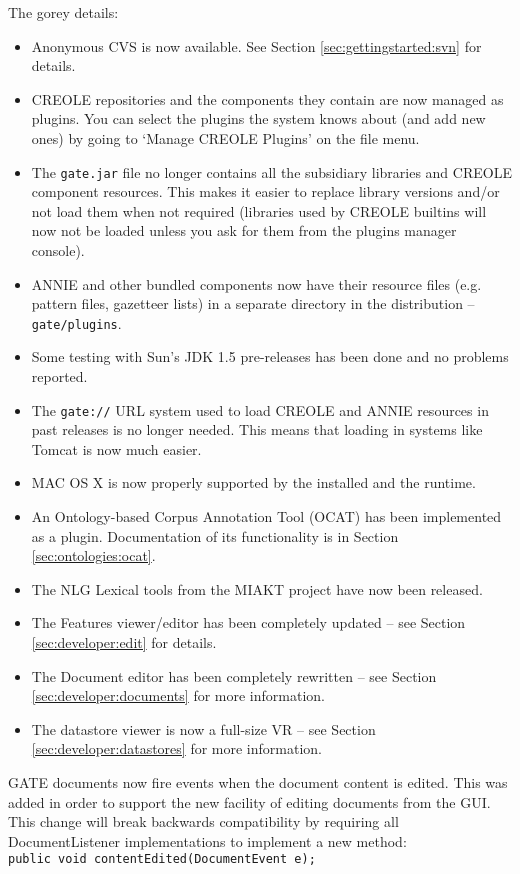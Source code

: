 The gorey details:
\begin{itemize}
%
\item
Anonymous CVS is now available.  See Section \ref{sec:gettingstarted:svn} for details.
%
\item
CREOLE repositories and the components they contain are now managed as
plugins. You can select the plugins the system knows about (and add new
ones) by going to `Manage CREOLE Plugins' on the file menu.
%
\item
The {\tt gate.jar} file no longer contains all the subsidiary libraries and
CREOLE component resources. This makes it easier to replace library versions
and/or not load them when not required (libraries used by CREOLE builtins
will now not be loaded unless you ask for them from the plugins manager
console).
%
\item
ANNIE and other bundled components now have their resource files (e.g.
pattern files, gazetteer lists) in a separate directory in the distribution
-- {\tt gate/plugins}.
%
\item
Some testing with Sun's JDK 1.5 pre-releases has been done and no problems
reported.
%
\item
The {\tt gate://} URL system used to load CREOLE and ANNIE resources in past
releases is no longer needed. This means that loading in systems like Tomcat
is now much easier.
%
\item
MAC OS X is now properly supported by the installed and the runtime.
%
\item
An Ontology-based Corpus Annotation Tool (OCAT) has been implemented as a
plugin. Documentation of its functionality is in Section
\ref{sec:ontologies:ocat}.
%
\item
The NLG Lexical tools from the MIAKT project have now been released.
%
\item
The Features viewer/editor has been completely updated -- see Section \ref{sec:developer:edit} for details.
%
\item
The Document editor has been completely rewritten
-- see Section \ref{sec:developer:documents} for more information.
%
\item
The datastore viewer is now a full-size VR -- see Section
\ref{sec:developer:datastores} for more information.
%
\end{itemize}
%



GATE documents now fire events when the document content is edited.  This
was added in order to support the new facility of editing documents from the
GUI. This change will break backwards compatibility by requiring all
DocumentListener implementations to implement a new method: \\
{\tt public void contentEdited(DocumentEvent e);}


